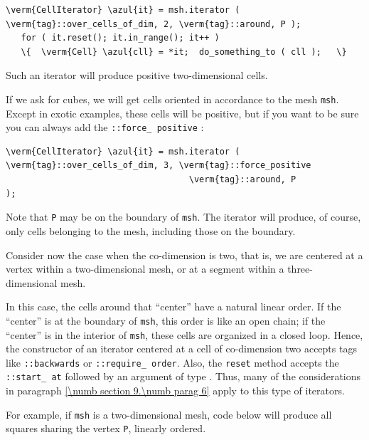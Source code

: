 \begin{Verbatim}[commandchars=\\\{\},formatcom=\small\tt,
   baselinestretch=0.94,framesep=2mm                      ]
   \verm{CellIterator} \azul{it} = msh.iterator ( \verm{tag}::over_cells_of_dim, 2, \verm{tag}::around, P );
   for ( it.reset(); it.in_range(); it++ )
   \{  \verm{Cell} \azul{cll} = *it;  do_something_to ( cll );   \}
\end{Verbatim}

Such an iterator will produce positive two-dimensional cells.

If we ask for cubes, we will get cells oriented in accordance to the mesh {\small\tt msh}.
Except in exotic examples, these cells will be positive, but if you want to be sure you
can always add the {\small\tt{}::force\_\,positive} :

\begin{Verbatim}[commandchars=\\\{\},formatcom=\small\tt,
   baselinestretch=0.94,framesep=2mm                      ]
   \verm{CellIterator} \azul{it} = msh.iterator ( \verm{tag}::over_cells_of_dim, 3, \verm{tag}::force_positive
                                    \verm{tag}::around, P                                 );
\end{Verbatim}

Note that {\small\tt P} may be on the boundary of {\small\tt msh}.
The iterator will produce, of course, only cells belonging to the mesh, including those
on the boundary.

Consider now the case when the co-dimension is two, that is, we are centered at a vertex
within a two-dimensional mesh, or at a segment within a three-dimensional mesh.

In this case, the cells around that ``center'' have a natural linear order.
If the ``center'' is at the boundary of {\small\tt msh}, this order is like an
open chain; if the ``center'' is in the interior of {\small\tt msh}, these cells
are organized in a closed loop.
Hence, the constructor of an iterator centered at a cell of co-dimension two accepts
tags like {\small\tt{}::backwards} or {\small\tt{}::require\_\,order}.
Also, the {\small\tt reset} method accepts the {\small\tt{}::start\_\,at} followed
by an argument of type {\small\tt{}}.
Thus, many of the considerations in paragraph \ref{\numb section 9.\numb parag 6}
apply to this type of iterators.

For example, if {\small\tt msh} is a two-dimensional mesh, code below will produce
all squares sharing the vertex {\small\tt P}, linearly ordered.

